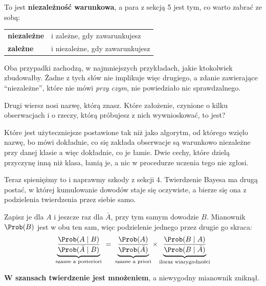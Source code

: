 \begin{fr}
To jest \textbf{niezależność warunkowa}, a para z sekcją 5 jest tym, co warto
zabrać ze sobą:

\begin{center}
\begin{tabular}{ll}
\toprule
\textbf{niezależne} & i zależne, gdy zawarunkujesz \\
\textbf{zależne}    & i niezależne, gdy zawarunkujesz \\
\bottomrule
\end{tabular}
\end{center}

Oba przypadki zachodzą, w najmniejszych przykładach, jakie ktokolwiek
zbudowałby. Żadne z tych słów nie implikuje więc drugiego, a zdanie zawierające
\enquote{niezależne}, które nie mówi \emph{przy czym}, nie powiedziało nic
sprawdzalnego.

Drugi wiersz nosi nazwę, którą znasz. Które założenie, czynione o kilku
obserwacjach i o rzeczy, którą próbujesz z nich wywnioskować, to jest?
\dotline
\nextframe
\end{fr}

\begin{fr}

Które jest użyteczniejsze postawione tak niż jako algorytm, od którego wzięło
nazwę, bo mówi dokładnie, co się zakłada \dash{} obserwacje są warunkowo
niezależne przy danej klasie \dash{} a więc dokładnie, co je łamie. Dwie
cechy, które dzielą przyczynę inną niż klasa, łamią je, a nic w procedurze
uczenia tego nie zgłosi.

Teraz spieniężmy to i naprawmy szkody z sekcji 4. Twierdzenie Bayesa ma drugą
postać, w której kumulowanie dowodów staje się oczywiste, a bierze się ona z
podzielenia twierdzenia przez siebie samo.

Zapisz je dla $A$ i jeszcze raz dla $\bar{A}$, przy tym samym dowodzie $B$.
Mianownik $\Prob(B)$ jest w obu ten sam, więc podzielenie jednego przez drugie
go skraca:
\[ \underbrace{\frac{\Prob(A \mid B)}{\Prob(\bar{A} \mid B)}}_{\text{szanse a posteriori}}
   \;=\;
   \underbrace{\frac{\Prob(A)}{\Prob(\bar{A})}}_{\text{szanse a priori}}
   \times
   \underbrace{\frac{\Prob(B \mid A)}{\Prob(B \mid \bar{A})}}_{\text{iloraz wiarygodności}} \]

\textbf{W szansach twierdzenie jest mnożeniem}, a niewygodny mianownik
zniknął.
\end{fr}

